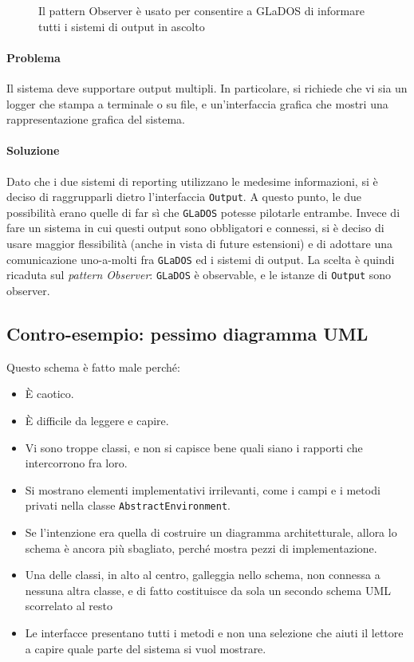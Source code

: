 \documentclass[a4paper,12pt]{report}
\begin{document}
\begin{figure}[H]
\centering{}
\caption{Il pattern Observer è usato per consentire a GLaDOS di informare tutti i sistemi di output in ascolto}
\label{img:observer}
\end{figure}

\paragraph{Problema} Il sistema deve supportare output multipli. In particolare, si richiede che vi sia un logger che stampa a terminale o su file,
e un'interfaccia grafica che mostri una rappresentazione grafica del sistema.

\paragraph{Soluzione} Dato che i due sistemi di reporting utilizzano le medesime informazioni, si è deciso di raggrupparli dietro l'interfaccia \texttt{Output}.
A questo punto, le due possibilità erano quelle di far sì che \texttt{GLaDOS} potesse pilotarle entrambe.
Invece di fare un sistema in cui questi output sono obbligatori e connessi, si è deciso di usare maggior flessibilità (anche in vista di future estensioni)
e di adottare una comunicazione uno-a-molti fra \texttt{GLaDOS} ed i sistemi di output.
La scelta è quindi ricaduta sul \textit{pattern Observer}: \texttt{GLaDOS} è observable, e le istanze di \texttt{Output} sono observer.
%


\subsection*{Contro-esempio: pessimo diagramma UML}

%
Questo schema è fatto male perché:
\begin{itemize}
	\item È caotico.
	\item È difficile da leggere e capire.
	\item Vi sono troppe classi, e non si capisce bene quali siano i rapporti che intercorrono fra loro.
	\item Si mostrano elementi implementativi irrilevanti, come i campi e i metodi privati nella classe \texttt{AbstractEnvironment}.
	\item Se l'intenzione era quella di costruire un diagramma architetturale, allora lo schema è ancora più sbagliato, perché mostra pezzi di implementazione.
	\item Una delle classi, in alto al centro, galleggia nello schema, non connessa a nessuna altra classe, e di fatto costituisce da sola un secondo schema UML scorrelato al resto
	\item Le interfacce presentano tutti i metodi e non una selezione che aiuti il lettore a capire quale parte del sistema si vuol mostrare.
\end{itemize}
\end{document}
